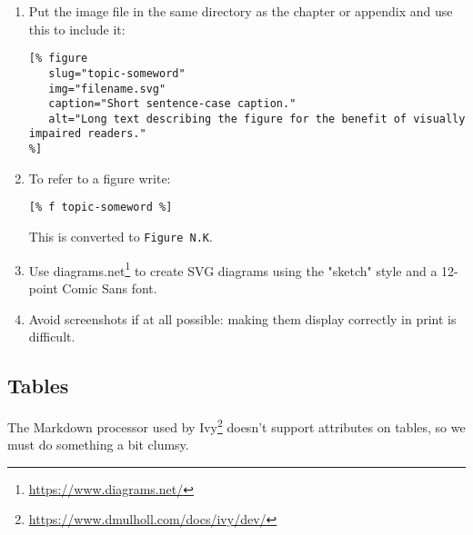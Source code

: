 \documentclass[krantzl]{krantz}
\newcommand{\hreffoot}[2]{{#1}\footnote{\href{#2}{#2}}}
\begin{document}
\begin{enumerate}

\item 

Put the image file in the same directory as the chapter or appendix
    and use this to include it:

\begin{lstlisting}[frame=single,frameround=tttt]
[% figure
   slug="topic-someword"
   img="filename.svg"
   caption="Short sentence-case caption."
   alt="Long text describing the figure for the benefit of visually impaired readers."
%]
\end{lstlisting}



\item 

To refer to a figure write:

\begin{lstlisting}[frame=single,frameround=tttt]
[% f topic-someword %]
\end{lstlisting}


This is converted to \texttt{Figure N.K}.



\item 

Use \hreffoot{diagrams.net}{https://www.diagrams.net/} to create SVG diagrams
    using the "sketch" style and a 12-point Comic Sans font.



\item 

Avoid screenshots if at all possible:
    making them display correctly in print is difficult.



\end{enumerate}

\subsection*{Tables}


The Markdown processor used by \hreffoot{Ivy}{https://www.dmulholl.com/docs/ivy/dev/} doesn't support attributes on tables,
so we must do something a bit clumsy.
\end{document}
